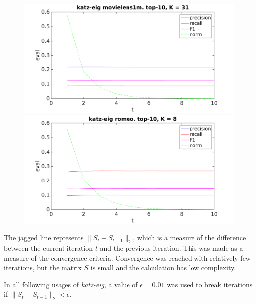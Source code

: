 \begin{figure}[h!]
\centering
\begin{minipage}{.5\textwidth}
    \centering
    \includegraphics[width=\linewidth]{fig/katzeig_t/movielens_katzeig_t.png}
\end{minipage}%
\begin{minipage}{.5\textwidth}
    \centering
    \includegraphics[width=\linewidth]{fig/katzeig_t/romeo_katzeig_t.png}
\end{minipage}
\end{figure}

\FloatBarrier

The jagged line represents $\|S_t - S_{t - 1}\|_2$, which is a measure of the difference between the current iteration $t$ and the previous iteration. This was made as a measure of the convergence criteria. Convergence was reached with relatively few iterations, but the matrix $S$ is small and the calculation has low complexity.

In all following usages of \textit{katz-eig}, a value of $\epsilon = 0.01$ was used to break iterations if $\|S_t - S_{t - 1}\|_2 < \epsilon$.

